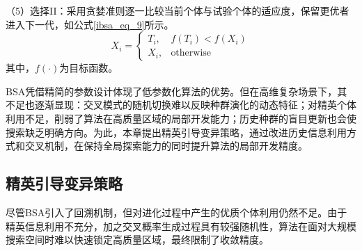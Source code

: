 （5）选择II：采用贪婪准则逐一比较当前个体与试验个体的适应度，保留更优者进入下一代，如公式\eqref{ibsa_eq_9}所示。
\begin{equation}
\label{ibsa_eq_9}
X_i=
\begin{cases}
T_i, & f\left(T_i\right)<f\left(X_i\right)\\
X_i, & \text{otherwise}
\end{cases}
\end{equation}
其中，$f(\cdot)$为目标函数。

BSA凭借精简的参数设计体现了低参数化算法的优势。但在高维复杂场景下，其不足也逐渐显现：交叉模式的随机切换难以反映种群演化的动态特征\cite{ibsa_ref63}；对精英个体利用不足，削弱了算法在高质量区域的局部开发能力\cite{ibsa_ref67}；历史种群的盲目更新也会使搜索缺乏明确方向。为此，本章提出精英引导变异策略，通过改进历史信息利用方式和交叉机制，在保持全局探索能力的同时提升算法的局部开发精度。


\subsection{精英引导变异策略}

尽管BSA引入了回溯机制，但对进化过程中产生的优质个体利用仍然不足\cite{ibsa_ref53}。由于精英信息利用不充分，加之交叉概率生成过程具有较强随机性，算法在面对大规模搜索空间时难以快速锁定高质量区域，最终限制了收敛精度。

